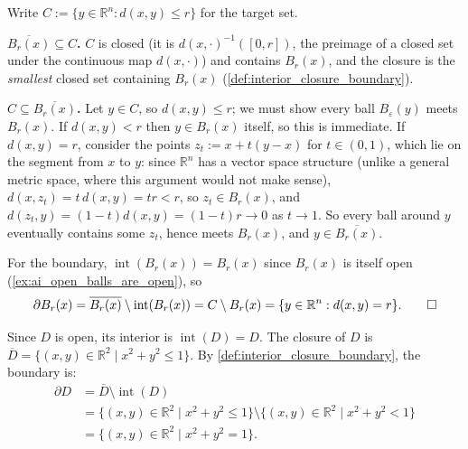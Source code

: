 \begin{exercisesolution}
\label{sol:closure_boundary_of_ball}
Write $C := \{y \in \mathbb{R}^n : d(x,y) \leq r\}$ for the target set.

\textbf{$\overline{B_r(x)} \subseteq C$.} $C$ is closed (it is $d(x,\cdot)^{-1}([0,r])$, the
preimage of a closed set under the continuous map $d(x,\cdot)$) and contains $B_r(x)$, and the
closure is the \emph{smallest} closed set containing $B_r(x)$
(\cref{def:interior_closure_boundary}).

\textbf{$C \subseteq \overline{B_r(x)}$.} Let $y \in C$, so $d(x,y) \leq r$; we must show every
ball $B_\varepsilon(y)$ meets $B_r(x)$. If $d(x,y) < r$ then $y \in B_r(x)$ itself, so this is
immediate. If $d(x,y) = r$, consider the points $z_t := x + t(y-x)$ for $t \in (0,1)$, which lie
on the segment from $x$ to $y$: since $\mathbb{R}^n$ has a vector space structure (unlike a
general metric space, where this argument would not make sense),
$d(x,z_t) = t\,d(x,y) = tr < r$, so $z_t \in B_r(x)$, and $d(z_t,y) = (1-t)d(x,y) = (1-t)r \to 0$
as $t \to 1$. So every ball around $y$ eventually contains some $z_t$, hence meets $B_r(x)$, and
$y \in \overline{B_r(x)}$.

For the boundary, $\operatorname{int}(B_r(x)) = B_r(x)$ since $B_r(x)$ is itself open
(\cref{ex:ai_open_balls_are_open}), so
\[\partial B_r(x) = \overline{B_r(x)} \setminus \operatorname{int}(B_r(x))
  = C \setminus B_r(x) = \{y \in \mathbb{R}^n : d(x,y) = r\}. \qedhere\]
\end{exercisesolution}

\begin{exercisesolution}
\label{sol:ai_disk_boundary}
Since $D$ is open, its interior is $\operatorname{int}(D) = D$. The closure of $D$ is $\overline{D} = \{(x,y) \in \mathbb{R}^2 \mid x^2 + y^2 \leq 1\}$. By \cref{def:interior_closure_boundary}, the boundary is:
\begin{align*}
\partial D &= \overline{D} \setminus \operatorname{int}(D) \\
&= \{(x,y) \in \mathbb{R}^2 \mid x^2 + y^2 \leq 1\} \setminus \{(x,y) \in \mathbb{R}^2 \mid x^2 + y^2 < 1\} \\
&= \{(x,y) \in \mathbb{R}^2 \mid x^2 + y^2 = 1\}.
\end{align*}
\end{exercisesolution}

